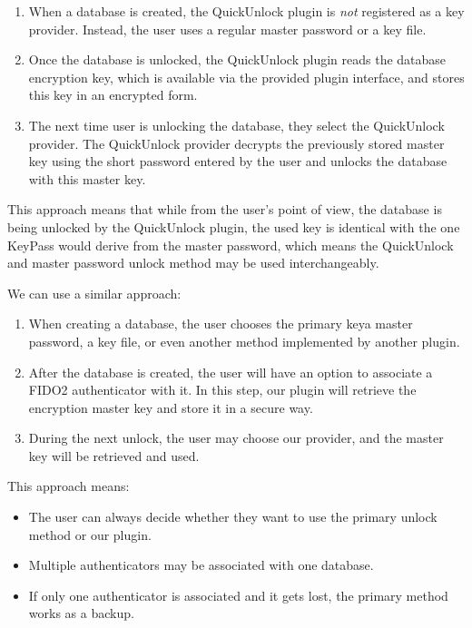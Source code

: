 \begin{enumerate}
	\item When a database is created, the QuickUnlock plugin is \emph{not} registered as a key provider. Instead, the user uses a regular master password or a key file.
	\item Once the database is unlocked, the QuickUnlock plugin reads the database encryption key, which is available via the provided plugin interface, and stores this key in an encrypted form.
	\item The next time user is unlocking the database, they select the QuickUnlock provider. The QuickUnlock provider decrypts the previously stored master key using the short password entered by the user and unlocks the database with this master key.
\end{enumerate}

This approach means that while from the user's point of view, the database is being unlocked by the QuickUnlock plugin,
the used key is identical with the one KeyPass would derive from the master password, which means the QuickUnlock and
master password unlock method may be used interchangeably.

We can use a similar approach:

\begin{enumerate}
	\item When creating a database, the user chooses the primary key\textemdash a master password, a key file, or even another method implemented by another plugin.
	\item After the database is created, the user will have an option to associate a FIDO2 authenticator with it. In this step, our plugin will retrieve the encryption master key and store it in a secure way.
	\item During the next unlock, the user may choose our provider, and the master key will be retrieved and used.
\end{enumerate}

This approach means:

\begin{itemize}
	\item The user can always decide whether they want to use the primary unlock method or our plugin.
	\item Multiple authenticators may be associated with one database.
	\item If only one authenticator is associated and it gets lost, the primary method works as a backup.
\end{itemize}

